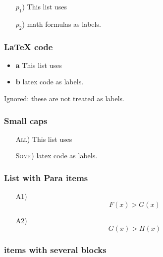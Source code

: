 \documentclass[
]{article}
\providecommand{\tightlist}{%
  \setlength{\itemsep}{0pt}\setlength{\parskip}{0pt}}
\begin{document}
\begin{itemize}
\tightlist

\item[\(p_1\))] This list uses

\item[\(p_2\))] math formulas as labels.

\end{itemize}

\hypertarget{latex-code}{%
\subsubsection{LaTeX code}\label{latex-code}}

\begin{itemize}
\tightlist
\item
  {\textbf{a}} This list uses
\item
  {\textbf{b}} latex code as labels.
\end{itemize}

Ignored: these are not treated as labels.

\hypertarget{small-caps}{%
\subsubsection{Small caps}\label{small-caps}}

\begin{itemize}
\tightlist

\item[\textsc{All})] This list uses

\item[\textsc{Some})] latex code as labels.

\end{itemize}

\hypertarget{list-with-para-items}{%
\subsubsection{List with Para items}\label{list-with-para-items}}

\begin{itemize}
\tightlist

\item[A1)] \[F(x) > G(x)\]

\item[A2)] \[G(x) > H(x)\]

\end{itemize}

\hypertarget{items-with-several-blocks}{%
\subsubsection{items with several
blocks}\label{items-with-several-blocks}}
\end{document}
